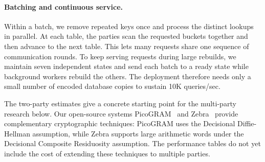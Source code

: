 \paragraph{Batching and continuous service.}
Within a batch, we remove repeated keys once and process the distinct
lookups in parallel. At each table, the parties scan the requested
buckets together and then advance to the next table. This lets many
requests share one sequence of communication rounds. To keep serving
requests during large rebuilds, we maintain seven independent states
and send each batch to a ready state while background workers rebuild
the others. The deployment therefore needs only a small number of
encoded database copies to sustain 10K queries/sec.


The two-party estimates give a concrete starting point for the
multi-party research below. Our open-source systems PicoGRAM~\cite{picogram}
and Zebra~\cite{zebra} provide complementary cryptographic techniques:
PicoGRAM uses the Decisional Diffie-Hellman assumption, while Zebra
supports large arithmetic words under the Decisional Composite
Residuosity assumption. The performance tables do not yet include the
cost of extending these techniques to multiple parties.


